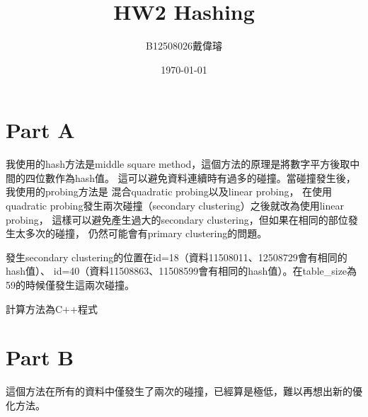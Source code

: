 \documentclass[12pt,a4paper]{article}
\title{HW2 Hashing}
\author{B12508026戴偉璿}
\date{\today}
\begin{document}
\maketitle

\newpage

\section*{Part A}

我使用的hash方法是middle square method，這個方法的原理是將數字平方後取中間的四位數作為hash值。
這可以避免資料連續時有過多的碰撞。當碰撞發生後，我使用的probing方法是
混合quadratic probing以及linear probing，
在使用quadratic probing發生兩次碰撞（secondary clustering）之後就改為使用linear probing，
這樣可以避免產生過大的secondary clustering，但如果在相同的部位發生太多次的碰撞，
仍然可能會有primary clustering的問題。

發生secondary clustering的位置在id=18（資料11508011、12508729會有相同的hash值）、
id=40（資料11508863、11508599會有相同的hash值）。在table\_size為59的時候僅發生這兩次碰撞。

計算方法為C++程式

\section*{Part B}
這個方法在所有的資料中僅發生了兩次的碰撞，已經算是極低，難以再想出新的優化方法。
\end{document}
